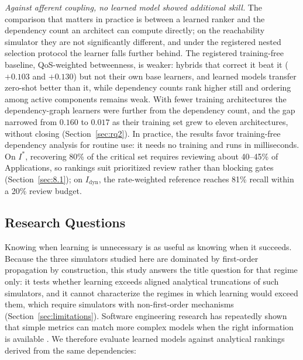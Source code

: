 \emph{Against afferent coupling, no learned model showed additional skill.} The comparison that matters in practice is between a learned ranker and the dependency count an architect can compute directly; on the reachability simulator they are not significantly different, and under the registered nested selection protocol the learner falls further behind. The registered training-free baseline, QoS-weighted betweenness, is weaker: hybrids that correct it beat it ($+0.103$ and $+0.130$) but not their own base learners, and learned models transfer zero-shot better than it, while dependency counts rank higher still and ordering among active components remains weak. With fewer training architectures the dependency-graph learners were further from the dependency count, and the gap narrowed from $0.160$ to $0.017$ as their training set grew to eleven architectures, without closing (Section~\ref{sec:rq2}). In practice, the results favor training-free dependency analysis for routine use: it needs no training and runs in milliseconds. On $I^*$, recovering 80\% of the critical set requires reviewing about 40--45\% of Applications, so rankings suit prioritized review rather than blocking gates (Section~\ref{sec:8.1}); on $I_{\text{dyn}}$, the rate-weighted reference reaches 81\% recall within a 20\% review budget.

\subsection{Research Questions}
\label{sec:1.4}

Knowing when learning is unnecessary is as useful as knowing when it succeeds. Because the three simulators studied here are dominated by first-order propagation by construction, this study answers the title question for that regime only: it tests whether learning exceeds aligned analytical truncations of such simulators, and it cannot characterize the regimes in which learning would exceed them, which require simulators with non-first-order mechanisms (Section~\ref{sec:limitations}). Software engineering research has repeatedly shown that simple metrics can match more complex models when the right information is available \cite{zimmermann2008predicting,premraj2011network,hellendoorn2017deep,errica2020fair}. We therefore evaluate learned models against analytical rankings derived from the same dependencies:

